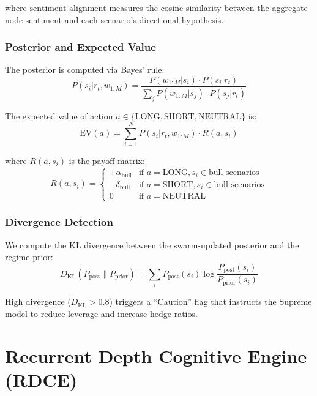 \documentclass[11pt, a4paper]{article}
\begin{document}
where $\text{sentiment\_alignment}$ measures the cosine similarity between the aggregate node sentiment and each scenario's directional hypothesis.

\subsubsection{Posterior and Expected Value}

The posterior is computed via Bayes' rule:
\begin{equation}
  P(s_i | r_t, w_{1:M}) = \frac{P(w_{1:M} | s_i) \cdot P(s_i | r_t)}{\sum_j P(w_{1:M} | s_j) \cdot P(s_j | r_t)}
\end{equation}

The expected value of action $a \in \{\text{LONG}, \text{SHORT}, \text{NEUTRAL}\}$ is:
\begin{equation}
  \text{EV}(a) = \sum_{i=1}^{N} P(s_i | r_t, w_{1:M}) \cdot R(a, s_i)
\end{equation}

where $R(a, s_i)$ is the payoff matrix:
\begin{equation}
R(a, s_i) = \begin{cases}
  +\alpha_{\text{bull}} & \text{if } a=\text{LONG}, s_i \in \text{bull scenarios} \\
  -\delta_{\text{bull}} & \text{if } a=\text{SHORT}, s_i \in \text{bull scenarios} \\
  0 & \text{if } a=\text{NEUTRAL}
\end{cases}
\end{equation}

\subsubsection{Divergence Detection}

We compute the KL divergence between the swarm-updated posterior and the regime prior:
\begin{equation}
  D_{\text{KL}}(P_{\text{post}} \| P_{\text{prior}}) = \sum_i P_{\text{post}}(s_i) \log \frac{P_{\text{post}}(s_i)}{P_{\text{prior}}(s_i)}
\end{equation}

High divergence ($D_{\text{KL}} > 0.8$) triggers a ``Caution'' flag that instructs the Supreme model to reduce leverage and increase hedge ratios.


\section{Recurrent Depth Cognitive Engine (RDCE)}
\label{sec:rdce}
\end{document}
